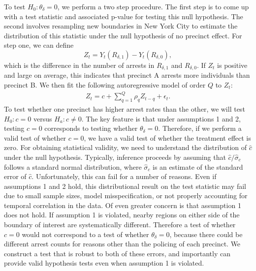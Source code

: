 \documentclass[a4paper,11pt]{article}
\begin{document}
To test $H_0: \theta_{\delta} = 0$, we perform a two step procedure. The first step is to come up with a test statistic and associated p-value for testing this null hypothesis. The second involves resampling new boundaries in New York City to estimate the distribution of this statistic under the null hypothesis of no precinct effect. For step one, we can define $$Z_t = Y_t(R_{\delta, 1}) - Y_t(R_{\delta, 0}),$$ which is the difference in the number of arrests in $R_{\delta, 1}$ and $R_{\delta, 0}$. If $Z_t$ is positive and large on average, this indicates that precinct A arrests more individuals than precinct B. We then fit the following autoregressive model of order $Q$ to $Z_t$:
\begin{align}
    Z_t = c + \sum_{q=1}^Q \rho_q Z_{t-q} + \epsilon_t. \label{eqn:TestStatistic}
\end{align}
To test whether one precinct has higher arrest rates than the other, we will test $H_0: c = 0$ versus $H_a: c \neq 0$. The key feature is that under assumptions 1 and 2, testing $c = 0$ corresponds to testing whether $\theta_{\delta} = 0$. Therefore, if we perform a valid test of whether $c=0$, we have a valid test of whether the treatment effect is zero. For obtaining statistical validity, we need to understand the distribution of $\widehat{c}$ under the null hypothesis. Typically, inference proceeds by assuming that $\widehat{c} / \widehat{\sigma}_c$ follows a standard normal distribution, where $\widehat{\sigma}_c$ is an estimate of the standard error of $\widehat{c}$. Unfortunately, this can fail for a number of reasons. Even if assumptions 1 and 2 hold, this distributional result on the test statistic may fail due to small sample sizes, model misspecification, or not properly accounting for temporal correlation in the data. Of even greater concern is that assumption 1 does not hold. If assumption 1 is violated, nearby regions on either side of the boundary of interest are systematically different. Therefore a test of whether $c = 0$ would not correspond to a test of whether $\theta_{\delta} = 0$, because there could be different arrest counts for reasons other than the policing of each precinct. We construct a test that is robust to both of these errors, and importantly can provide valid hypothesis tests even when assumption 1 is violated. 
\end{document}
